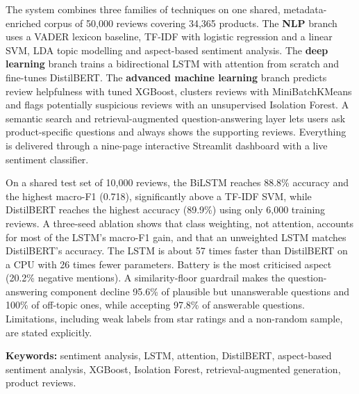 \documentclass[12pt,a4paper]{report}
\begin{document}
The system combines three families of techniques on one shared, metadata-enriched corpus of 50,000 reviews covering 34,365 products. The \textbf{NLP} branch uses a VADER lexicon baseline, TF-IDF with logistic regression and a linear SVM, LDA topic modelling and aspect-based sentiment analysis. The \textbf{deep learning} branch trains a bidirectional LSTM with attention from scratch and fine-tunes DistilBERT. The \textbf{advanced machine learning} branch predicts review helpfulness with tuned XGBoost, clusters reviews with MiniBatchKMeans and flags potentially suspicious reviews with an unsupervised Isolation Forest. A semantic search and retrieval-augmented question-answering layer lets users ask product-specific questions and always shows the supporting reviews. Everything is delivered through a nine-page interactive Streamlit dashboard with a live sentiment classifier.

On a shared test set of 10,000 reviews, the BiLSTM reaches 88.8\% accuracy and the highest macro-F1 (0.718), significantly above a TF-IDF SVM, while DistilBERT reaches the highest accuracy (89.9\%) using only 6,000 training reviews. A three-seed ablation shows that class weighting, not attention, accounts for most of the LSTM's macro-F1 gain, and that an unweighted LSTM matches DistilBERT's accuracy. The LSTM is about 57 times faster than DistilBERT on a CPU with 26 times fewer parameters. Battery is the most criticised aspect (20.2\% negative mentions). A similarity-floor guardrail makes the question-answering component decline 95.6\% of plausible but unanswerable questions and 100\% of off-topic ones, while accepting 97.8\% of answerable questions. Limitations, including weak labels from star ratings and a non-random sample, are stated explicitly.

\medskip
\noindent\textbf{Keywords:} sentiment analysis, LSTM, attention, DistilBERT, aspect-based sentiment analysis, XGBoost, Isolation Forest, retrieval-augmented generation, product reviews.
\clearpage

\tableofcontents
\clearpage
\listoffigures
\clearpage
\listoftables
\clearpage

\end{document}
